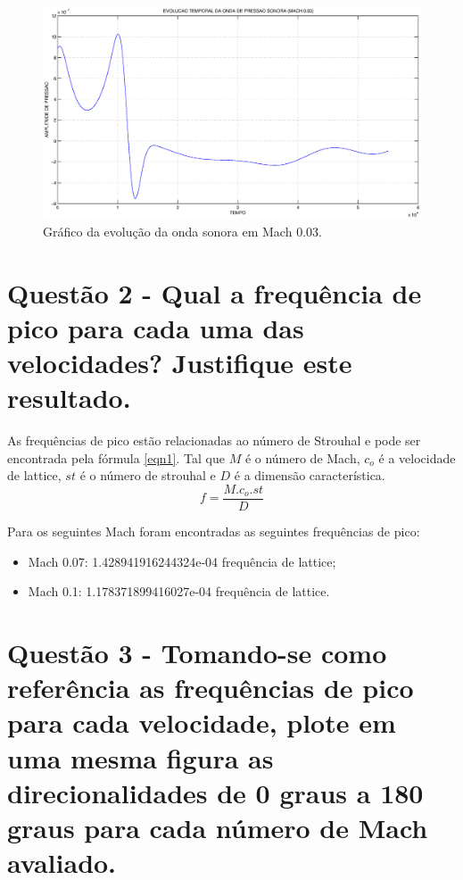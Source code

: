\begin{figure}[h!]
    \centering
    \hspace{-1.cm}
    \includegraphics[width=1.\textwidth]{Mach_0.03/pressao_estabilizada_no_tempo.eps}
    \caption{Gráfico da evolução da onda sonora em Mach 0.03.}
\end{figure} 

\section{Questão 2 - Qual a frequência de pico para cada uma das velocidades? Justifique este resultado.}

As frequências de pico estão relacionadas ao número de Strouhal e pode ser encontrada pela fórmula \ref{eqn1}. Tal que $M$ é o número de Mach, $c_{o}$ é a velocidade de lattice, $st$ é o número de strouhal e $D$ é a dimensão característica.
\begin{equation}
    f = \frac{M.c_{o}.st}{D}
    \label{eqn1}
\end{equation}

Para os seguintes Mach foram encontradas as seguintes frequências de pico:
\begin{itemize}
    \item Mach 0.07: 1.428941916244324e-04 frequência de lattice;
    \item Mach 0.1: 1.178371899416027e-04 frequência de lattice.
\end{itemize}

\section{Questão 3 - Tomando-se como referência as frequências de pico para cada velocidade, plote em uma mesma figura as direcionalidades de 0 graus a 180 graus para cada número de Mach avaliado.}


